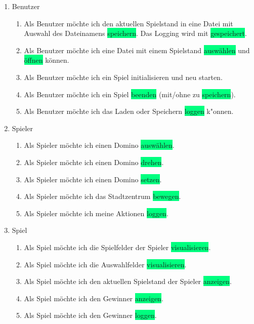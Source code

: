 \begin{enumerate}
	\item Benutzer
	\begin{enumerate}
		\item Als \colorbox{Apricot}{Benutzer} möchte ich den aktuellen Spielstand in eine Datei mit Auswahl des Dateinamens \colorbox{SpringGreen}{speichern}. Das Logging wird mit \colorbox{SpringGreen}{gespeichert}.
		\item Als \colorbox{Apricot}{Benutzer} möchte ich eine Datei mit einem Spielstand  \colorbox{SpringGreen}{auswählen} und \colorbox{SpringGreen}{öffnen} können.
		\item Als \colorbox{Apricot}{Benutzer} möchte ich ein \colorbox{Apricot}{Spiel} initialisieren und neu starten.
		\item Als \colorbox{Apricot}{Benutzer} möchte ich ein \colorbox{Apricot}{Spiel} \colorbox{SpringGreen}{beenden} (mit/ohne zu \colorbox{SpringGreen}{speichern}).
		\item Als \colorbox{Apricot}{Benutzer} möchte ich das Laden oder Speichern  \colorbox{SpringGreen}{loggen} k"onnen.
	\end{enumerate}	
	\item Spieler
	\begin{enumerate}
		\item Als \colorbox{Apricot}{Spieler} möchte ich einen \colorbox{Apricot}{Domino} \colorbox{SpringGreen}{auswählen}.
 		\item Als \colorbox{Apricot}{Spieler} möchte ich einen \colorbox{Apricot}{Domino} \colorbox{SpringGreen}{drehen}.
		\item Als \colorbox{Apricot}{Spieler} möchte ich einen \colorbox{Apricot}{Domino} \colorbox{SpringGreen}{setzen}.
		\item Als \colorbox{Apricot}{Spieler} möchte ich das Stadtzentrum \colorbox{SpringGreen}{bewegen}.
		\item Als \colorbox{Apricot}{Spieler} möchte ich meine Aktionen \colorbox{SpringGreen}{loggen}.
	\end{enumerate}
	\item Spiel
	\begin{enumerate}
		\item Als \colorbox{Apricot}{Spiel} möchte ich die \colorbox{Apricot}{Spielfelder} der Spieler \colorbox{SpringGreen}{visualisieren}.
		\item Als \colorbox{Apricot}{Spiel} möchte ich die \colorbox{Apricot}{Auswahlfelder} \colorbox{SpringGreen}{visualisieren}.
		\item Als \colorbox{Apricot}{Spiel} möchte ich den \colorbox{Apricot}{aktuellen Spielstand} der Spieler \colorbox{SpringGreen}{anzeigen}.
		\item Als \colorbox{Apricot}{Spiel} möchte ich den \colorbox{Apricot}{Gewinner} \colorbox{SpringGreen}{anzeigen}.
		\item Als \colorbox{Apricot}{Spiel} möchte ich den \colorbox{Apricot}{Gewinner} \colorbox{SpringGreen}{loggen}.
	\end{enumerate}
\end{enumerate}

